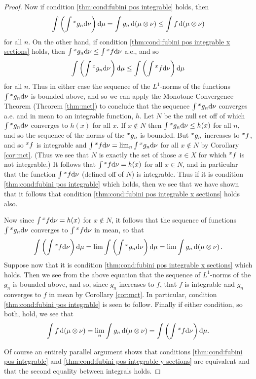 \begin{proof}
Now if condition \ref{thm:cond:fubini pos integrable} holds, then $$\int\br{\int\xsec{g_n}{x}\dd\nu}\dd\mu=\int g_n\dd(\mu\otimes\nu)\leq\int f\dd(\mu\otimes\nu)$$ for all $n$. On the other hand, if condition \ref{thm:cond:fubini pos integrable x sections} holds, then $\int\xsec{g_n}{x}\dd\nu\leq\int\xsec{f}{x}\dd\nu$ a.e., and so $$\int\br{\int\xsec{g_n}{x}\dd\nu}\dd\mu\leq\int\br{\int\xsec{f}{x}\dd\nu}\dd\mu$$ for all $n$. Thus in either case the sequence of the $L^1$-norms of the functions $\int\xsec{g_n}{x}\dd\nu$ is bounded above, and so we can apply the Monotone Convergence Theorem (Theorem \ref{thm:mct}) to conclude that the sequence $\int\xsec{g_n}{x}\dd\nu$ converges a.e. and in mean to an integrable function, $h$. Let $N$ be the null set off of which $\int\xsec{g_n}{x}\dd\nu$ converges to $h(x)$ for all $x$. If $x\notin N$ then $\int\xsec{g_n}{x}\dd\nu\leq h(x)$ for all $n$, and so the sequence of the norms of the $\xsec{g_n}{x}$ is bounded. But $\xsec{g_n}{x}$ increases to $\xsec{f}{x}$, and so $\xsec{f}{x}$ is integrable and $\int\xsec{f}{x}\dd\nu=\lim_n\int\xsec{g_n}{x}\dd\nu$ for all $x\notin N$ by Corollary \ref{cor:mct}. (Thus we see that $N$ is exactly the set of those $x\in X$ for which $\xsec{f}{x}$ is not integrable.) It follows that $\int\xsec{f}{x}\dd\nu=h(x)$ for all $x\in N$, and in particular that the function $\int\xsec{f}{x}\dd\nu$ (defined off of $N$) is integrable. Thus if it is condition \ref{thm:cond:fubini pos integrable} which holds, then we see that we have shown that it follows that condition \ref{thm:cond:fubini pos integrable x sections} holds also.

Now since $\int\xsec{f}{x}\dd\nu=h(x)$ for $x\notin N$, it follows that the sequence of functions $\int\xsec{g_n}{x}\dd\nu$ converges to $\int\xsec{f}{x}\dd\nu$ in mean, so that $$\int\br{\int\xsec{f}{x}\dd\nu}\dd\mu=\lim\int\br{\int\xsec{g_n}{x}\dd\nu}\dd\mu=\lim\int g_n\dd(\mu\otimes\nu).$$ Suppose now that it is condition \ref{thm:cond:fubini pos integrable x sections} which holds. Then we see from the above equation that the sequence of $L^1$-norms of the $g_n$ is bounded above, and so, since $g_n$ increases to $f$, that $f$ is integrable and $g_n$ converges to $f$ in mean by Corollary \ref{cor:mct}. In particular, condition \ref{thm:cond:fubini pos integrable} is seen to follow. Finally if either condition, so both, hold, we see that $$\int f\dd(\mu\otimes\nu)=\lim_n\int g_n\dd(\mu\otimes\nu)=\int\br{\int\xsec{f}{x}\dd\nu}\dd\mu.$$

Of course an entirely parallel argument shows that conditions \ref{thm:cond:fubini pos integrable} and \ref{thm:cond:fubini pos integrable y sections} are equivalent and that the second equality between integrals holds.
\end{proof}

